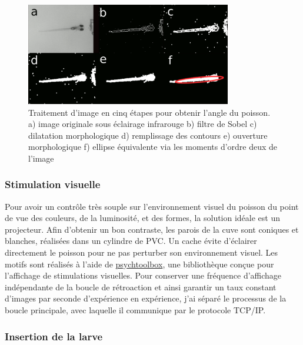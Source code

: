 \begin{figure}
    \centering
    \includegraphics[width=0.8\textwidth]{./files/image_process.png}
    \caption{Traitement d'image en cinq étapes pour obtenir l'angle du poisson. a) image originale sous éclairage infrarouge b) filtre de Sobel c) dilatation morphologique d) remplissage des contours e) ouverture morphologique f) ellipse équivalente via les moments d'ordre deux de l'image
    \label{FIGimageprocessing}}
    \end{figure}


\subsubsection{Stimulation visuelle}
Pour avoir un contrôle très souple sur l'environnement visuel du poisson du point de vue des couleurs, de la luminosité, et des formes, la solution idéale est un projecteur. Afin d'obtenir un bon contraste, les parois de la cuve sont coniques et blanches, réalisées dans un cylindre de PVC. Un cache évite d'éclairer directement le poisson pour ne pas perturber son environnement visuel. Les motifs sont réalisés à l'aide de \href{http://psychtoolbox.org/}{psychtoolbox}, une bibliothèque conçue pour l'affichage de stimulations visuelles. Pour conserver une fréquence d'affichage indépendante de la boucle de rétroaction et ainsi garantir un taux constant d'images par seconde d'expérience en expérience, j'ai séparé le processus de la boucle principale, avec laquelle il communique par le protocole TCP/IP.

\subsubsection{Insertion de la larve}

